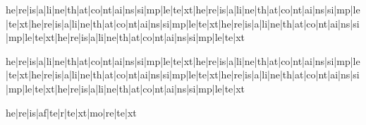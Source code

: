 he|re|is|a|li|ne|th|at|co|nt|ai|ns|si|mp|le|te|xt|he|re|is|a|li|ne|th|at|co|nt|ai|ns|si|mp|le|te|xt|he|re|is|a|li|ne|th|at|co|nt|ai|ns|si|mp|le|te|xt|he|re|is|a|li|ne|th|at|co|nt|ai|ns|si|mp|le|te|xt|he|re|is|a|li|ne|th|at|co|nt|ai|ns|si|mp|le|te|xt %

he|re|is|a|li|ne|th|at|co|nt|ai|ns|si|mp|le|te|xt|he|re|is|a|li|ne|th|at|co|nt|ai|ns|si|mp|le|te|xt|he|re|is|a|li|ne|th|at|co|nt|ai|ns|si|mp|le|te|xt|he|re|is|a|li|ne|th|at|co|nt|ai|ns|si|mp|le|te|xt|he|re|is|a|li|ne|th|at|co|nt|ai|ns|si|mp|le|te|xt%

he|re|is|af|te|r|te|xt|mo|re|te|xt %
